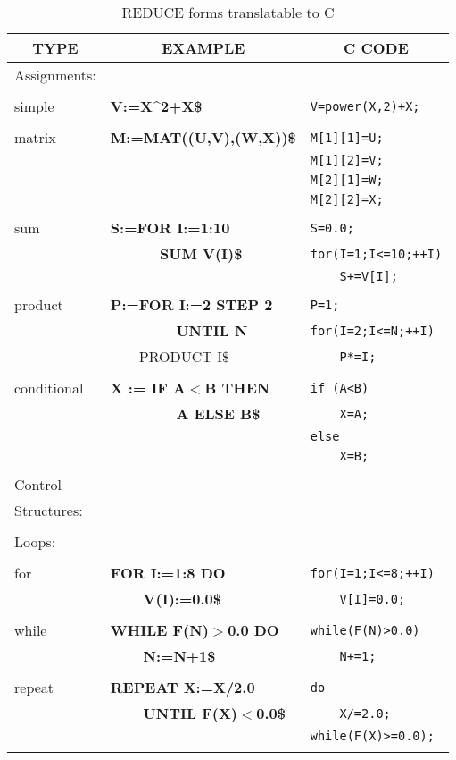 \begin{table}
\begin{tabular}{||l|l|l||}\hline\hline
\multicolumn{1}{||c|}{\bf TYPE} & \multicolumn{1}{c|}{\bf EXAMPLE}
 & \multicolumn{1}{c||}{\bf C CODE} \\ \hline\hline
Assignments: & &\\
& & \\
    simple     &{\bf V:=X\^{}2+X\$} &\verb!V=power(X,2)+X;!\\
& & \\
    matrix     &{\bf M:=MAT((U,V),(W,X))\$} &\verb!M[1][1]=U;!\\
& &\verb!M[1][2]=V;!\\
& &\verb!M[2][1]=W;!\\
& &\verb!M[2][2]=X;!\\
& & \\
    sum &{\bf S:=FOR I:=1:10} &\verb!S=0.0;!\\
&{\bf\ \ \ \ \ \ SUM V(I)\$} &\verb!for(I=1;I<=10;++I)!\\
& &\verb!    S+=V[I];!\\
& & \\
    product    &{\bf P:=FOR I:=2 STEP 2} &\verb!P=1;!\\
&{\bf\ \ \ \ \ \ \ \ UNTIL N} &\verb!for(I=2;I<=N;++I)!\\
&{\ \ \ \ PRODUCT I\$} &\verb!    P*=I;!\\
& & \\
conditional & {\bf X := IF A$<$B THEN} &\verb!if (A<B)!\\
& {\bf \ \ \ \ \ \ \ \ A ELSE B\$} &\verb!    X=A;!\\
& &\verb!else!\\
& &\verb!    X=B;!\\
& & \\\hline
Control & & \\
Structures: & &\\
& & \\
  Loops: & &\\
& &\\
    for &{\bf FOR I:=1:8 DO} &\verb!for(I=1;I<=8;++I)!\\
&{\bf \ \ \ \ V(I):=0.0\$} &\verb!    V[I]=0.0;!\\
& & \\
    while      &{\bf WHILE F(N)$>$0.0 DO} &\verb!while(F(N)>0.0)!\\
&{\bf \ \ \ \ N:=N+1\$} &\verb!    N+=1;!\\
& & \\
   repeat     &{\bf REPEAT X:=X/2.0} &\verb!do!\\
&{\bf \ \ \ \ UNTIL F(X)$<$0.0\$} &\verb!    X/=2.0;!\\
& &\verb!while(F(X)>=0.0);!\\
& & \\\hline\hline
\end{tabular}
\caption{REDUCE forms translatable to C}
\end{table}

